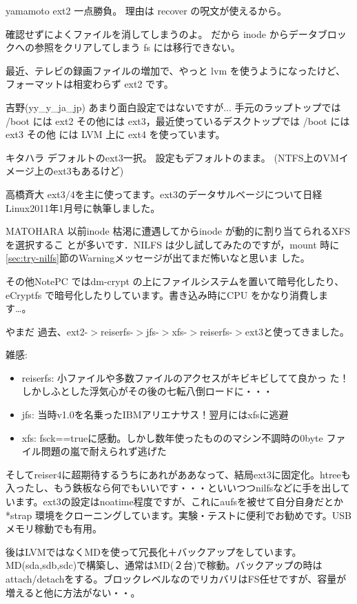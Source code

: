 \begin{prework}{ yamamoto }
ext2 一点勝負。
理由は recover の呪文が使えるから。

確認せずによくファイルを消してしまうのよ。
だから inode からデータブロックへの参照をクリアしてしまう fs には移行できない。

最近、テレビの録画ファイルの増加で、やっと lvm を使うようになったけど、フォーマットは相変わらず ext2 です。
\end{prework}

\begin{prework}{ 吉野(yy\_y\_ja\_jp) }
あまり面白設定ではないですが... 手元のラップトップでは /boot には ext2
 その他には ext3，最近使っているデスクトップでは /boot には ext3 その他
 には LVM 上に ext4 を使っています。
\end{prework}

\begin{prework}{ キタハラ }
デフォルトのext3一択。
設定もデフォルトのまま。
(NTFS上のVMイメージ上のext3もあるけど)
\end{prework}

\begin{prework}{高橋斉大}
ext3/4を主に使ってます。ext3のデータサルベージについて日経Linux2011年1月号に執筆しました。
\end{prework}

\begin{prework}{ MATOHARA }
以前inode 枯渇に遭遇してからinode が動的に割り当てられるXFS を選択するこ
 とが多いです．NILFS は少し試してみたのですが，mount 時に
 \ref{sec:try-nilfs}節のWarningメッセージが出てまだ怖いなと思いま
 した。

その他NotePC ではdm-crypt の上にファイルシステムを置いて暗号化したり、
 eCryptfs で暗号化したりしています。書き込み時にCPU をかなり消費します…。
\end{prework}

\begin{prework}{ やまだ }
過去、ext2-$>$reiserfs-$>$jfs-$>$xfs-$>$reiserfs-$>$ext3と使ってきました。

雑感:
\begin{itemize}
 \item reiserfs: 小ファイルや多数ファイルのアクセスがキビキビしてて良かっ
       た！しかしふとした浮気心がその後の七転八倒ロードに・・・
 \item jfs: 当時v1.0を名乗ったIBMアリエナサス！翌月にはxfsに逃避
 \item xfs: fsck==trueに感動。しかし数年使ったもののマシン不調時の0byte
       ファイル問題の嵐で耐えられず逃げた
\end{itemize}
そしてreiser4に超期待するうちにあれがああなって、結局ext3に固定化。htreeも入ったし、もう鉄板なら何でもいいです・・・といいつつnilfsなどに手を出しています。ext3の設定はnoatime程度ですが、これにaufsを被せて自分自身だとか *strap 環境をクローニングしています。実験・テストに便利でお勧めです。USBメモリ稼動でも有用。

後はLVMではなくMDを使って冗長化＋バックアップをしています。
 MD(sda,sdb,sdc)で構築し、通常はMD(２台)で稼動。バックアップの時は
 attach/detachをする。ブロックレベルなのでリカバリはFS任せですが、容量が
 増えると他に方法がない・・。
\end{prework}

